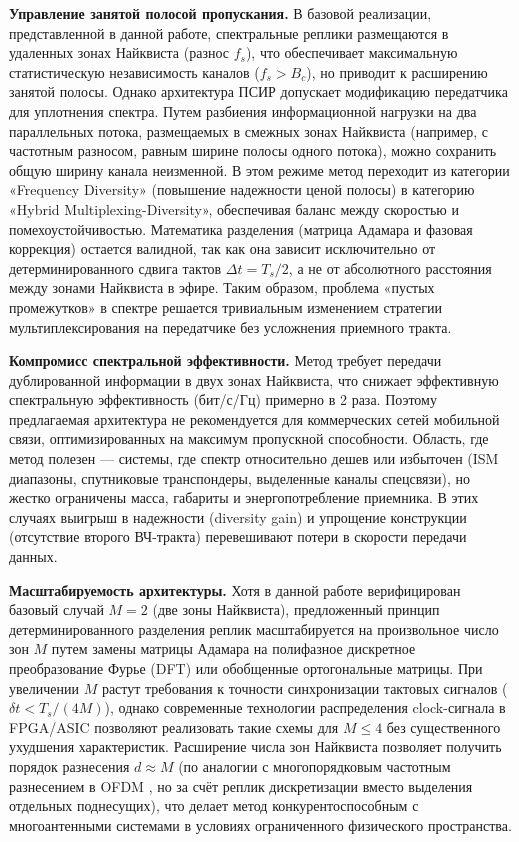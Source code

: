 \documentclass[a4paper,12pt]{article}
\numberwithin{equation}{section}
\begin{document}
\textbf{Управление занятой полосой пропускания.}
В базовой реализации, представленной в данной работе, спектральные реплики размещаются в удаленных зонах Найквиста (разнос $f_s$), что обеспечивает максимальную статистическую независимость каналов ($f_s > B_c$), но приводит к расширению занятой полосы. Однако архитектура ПСИР допускает модификацию передатчика для уплотнения спектра. Путем разбиения информационной нагрузки на два параллельных потока, размещаемых в смежных зонах Найквиста (например, с частотным разносом, равным ширине полосы одного потока), можно сохранить общую ширину канала неизменной. В этом режиме метод переходит из категории «Frequency Diversity» (повышение надежности ценой полосы) в категорию «Hybrid Multiplexing-Diversity», обеспечивая баланс между скоростью и помехоустойчивостью. Математика разделения (матрица Адамара и фазовая коррекция) остается валидной, так как она зависит исключительно от детерминированного сдвига тактов $\Delta t = T_s/2$, а не от абсолютного расстояния между зонами Найквиста в эфире. Таким образом, проблема «пустых промежутков» в спектре решается тривиальным изменением стратегии мультиплексирования на передатчике без усложнения приемного тракта.

\textbf{Компромисс спектральной эффективности.} Метод требует передачи дублированной информации в двух зонах Найквиста, что снижает эффективную спектральную эффективность (бит/с/Гц) примерно в 2 раза. Поэтому предлагаемая архитектура не рекомендуется для коммерческих сетей мобильной связи, оптимизированных на максимум пропускной способности. Область, где метод полезен — системы, где спектр относительно дешев или избыточен (ISM диапазоны, спутниковые транспондеры, выделенные каналы спецсвязи), но жестко ограничены масса, габариты и энергопотребление приемника. В этих случаях выигрыш в надежности (diversity gain) и упрощение конструкции (отсутствие второго ВЧ-тракта) перевешивают потери в скорости передачи данных.

\textbf{Масштабируемость архитектуры.} Хотя в данной работе верифицирован базовый случай $M=2$ (две зоны Найквиста), предложенный принцип детерминированного разделения реплик масштабируется на произвольное число зон $M$ путем замены матрицы Адамара на полифазное дискретное преобразование Фурье (DFT) или обобщенные ортогональные матрицы. При увеличении $M$ растут требования к точности синхронизации тактовых сигналов ($\delta t < T_s/(4M)$), однако современные технологии распределения clock-сигнала в FPGA/ASIC позволяют реализовать такие схемы для $M \le 4$ без существенного ухудшения характеристик. Расширение числа зон Найквиста позволяет получить порядок разнесения $d \approx M$ (по аналогии с многопорядковым частотным разнесением в OFDM \cite{abdelgader}, но за счёт реплик дискретизации вместо выделения отдельных поднесущих), что делает метод конкурентоспособным с многоантенными системами в условиях ограниченного физического пространства.
\end{document}
